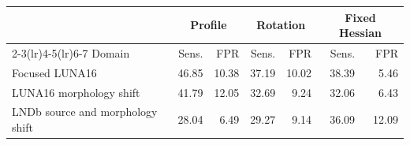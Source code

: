 \begin{tabular}{@{}lrrrrrr@{}}
\toprule
& \multicolumn{2}{c}{Profile} & \multicolumn{2}{c}{Rotation} & \multicolumn{2}{c}{Fixed Hessian} \\
\cmidrule(lr){2-3}\cmidrule(lr){4-5}\cmidrule(lr){6-7}
Domain & Sens. & FPR & Sens. & FPR & Sens. & FPR \\
\midrule
Focused LUNA16 & 46.85 & 10.38 & 37.19 & 10.02 & 38.39 & 5.46 \\
LUNA16 morphology shift & 41.79 & 12.05 & 32.69 & 9.24 & 32.06 & 6.43 \\
LNDb source and morphology shift & 28.04 & 6.49 & 29.27 & 9.14 & 36.09 & 12.09 \\
\bottomrule
\end{tabular}
